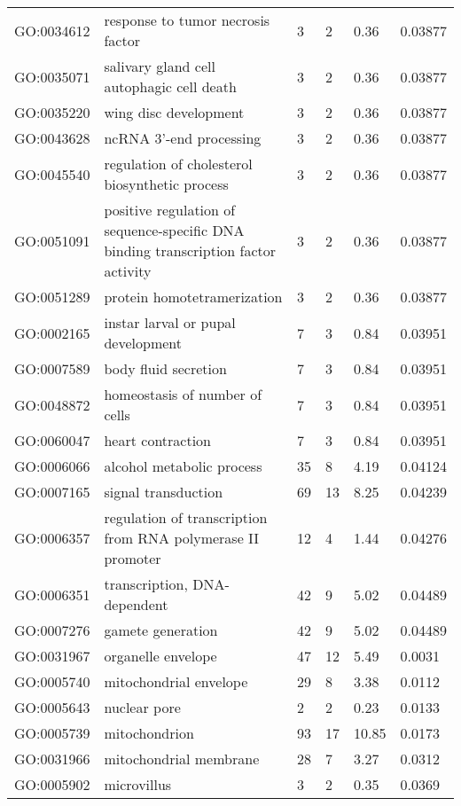 \documentclass[10pt]{bmc_article}
\newenvironment{bmcformat}{\begin{raggedright}\baselineskip20pt\sloppy\setboolean{publ}{false}}{\end{raggedright}\baselineskip20pt\sloppy}
\begin{document}
\begin{bmcformat}
\begin{longtable}{lp{4.5cm}llll}
  GO:0034612 & response to tumor necrosis factor &   3 &   2 & 0.36 & 0.03877 \\ 
  GO:0035071 & salivary gland cell autophagic cell death &   3 &   2 & 0.36 & 0.03877 \\ 
  GO:0035220 & wing disc development &   3 &   2 & 0.36 & 0.03877 \\ 
  GO:0043628 & ncRNA 3'-end processing &   3 &   2 & 0.36 & 0.03877 \\ 
  GO:0045540 & regulation of cholesterol biosynthetic process &   3 &   2 & 0.36 & 0.03877 \\ 
  GO:0051091 & positive regulation of sequence-specific DNA binding transcription factor activity &   3 &   2 & 0.36 & 0.03877 \\ 
  GO:0051289 & protein homotetramerization &   3 &   2 & 0.36 & 0.03877 \\ 
  GO:0002165 & instar larval or pupal development &   7 &   3 & 0.84 & 0.03951 \\ 
  GO:0007589 & body fluid secretion &   7 &   3 & 0.84 & 0.03951 \\ 
  GO:0048872 & homeostasis of number of cells &   7 &   3 & 0.84 & 0.03951 \\ 
  GO:0060047 & heart contraction &   7 &   3 & 0.84 & 0.03951 \\ 
  GO:0006066 & alcohol metabolic process &  35 &   8 & 4.19 & 0.04124 \\ 
  GO:0007165 & signal transduction &  69 &  13 & 8.25 & 0.04239 \\ 
  GO:0006357 & regulation of transcription from RNA polymerase II promoter &  12 &   4 & 1.44 & 0.04276 \\ 
  GO:0006351 & transcription, DNA-dependent &  42 &   9 & 5.02 & 0.04489 \\ 
  GO:0007276 & gamete generation &  42 &   9 & 5.02 & 0.04489 \\ 
   \hline
GO:0031967 & organelle envelope &  47 &  12 & 5.49 & 0.0031 \\ 
  GO:0005740 & mitochondrial envelope &  29 &   8 & 3.38 & 0.0112 \\ 
  GO:0005643 & nuclear pore &   2 &   2 & 0.23 & 0.0133 \\ 
  GO:0005739 & mitochondrion &  93 &  17 & 10.85 & 0.0173 \\ 
  GO:0031966 & mitochondrial membrane &  28 &   7 & 3.27 & 0.0312 \\ 
  GO:0005902 & microvillus &   3 &   2 & 0.35 & 0.0369 \\ 
   \hline
\hline
\end{longtable}
\normalsize


\end{bmcformat}
\end{document}

